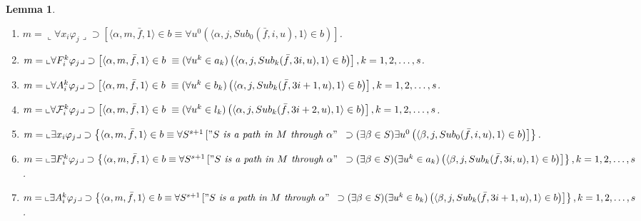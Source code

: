 \documentclass{asl}
\newtheorem{lemma}{Lemma}[section]
\theoremstyle{definition}
\begin{document}
\begin{lemma}
\begin{enumerate}
\item $m=\llcorner\forall x_i \varphi_j\lrcorner 
\supset \left[\langle\alpha, m,\bar{f},1\rangle \in b \equiv \forall u^0\left(\langle \alpha,j,
Sub_0(\bar{f},i,u),1\rangle \in b \right)\right]$.
\medskip

\item $m=\llcorner\forall F_i^k \varphi_j\lrcorner 
\supset \left[\langle\alpha, m,\bar{f},1\rangle \in b 
\right.
\smallskip
\\
\left.
\equiv(\forall u^k\in a_k)\left(\langle \alpha,j,
Sub_k(\bar{f},3i,u),1\rangle \in b \right)\right],
k=1,2,\ldots,s$.
\medskip

\item $m=\llcorner\forall A_i^k \varphi_j\lrcorner 
\supset \left[\langle\alpha, m,\bar{f},1\rangle \in b 
\right.
\smallskip
\\
\left.
\equiv(\forall u^k\in b_k)\left(\langle \alpha,j,
Sub_k(\bar{f},3i+1,u),1\rangle \in b \right)\right],
k=1,2,\ldots,s$.
\medskip

\item $m=\llcorner\forall \mathcal{F}_i^k \varphi_j\lrcorner 
\supset \left[\langle\alpha, m,\bar{f},1\rangle \in b 
\right.
\smallskip
\\
\left.
\equiv(\forall u^k\in l_k)\left(\langle \alpha,j,
Sub_k(\bar{f},3i+2,u),1\rangle \in b \right)\right],
k=1,2,\ldots,s$.
\medskip

\item $m=\llcorner\exists x_i \varphi_j\lrcorner 
\supset \left\lbrace \langle\alpha, m,\bar{f},1\rangle \in b \equiv 
\forall S^{s+1}\left["S\textit{ is a path in }M\textit{ through }\alpha" 
\right.
\right.
\smallskip
\\
\left.
\left.
\supset(\exists\beta\in S)\exists u^0\left(\langle \beta,j,Sub_0(\bar{f},i,u),1\rangle \in b \right)
\right] \right\rbrace$.
\medskip

\item $m=\llcorner\exists F_i^k \varphi_j\lrcorner 
\supset \left\lbrace \langle\alpha, m,\bar{f},1\rangle \in b \equiv 
\forall S^{s+1}\left["S\textit{ is a path in }M\textit{ through }\alpha" 
\right.
\right.
\smallskip
\\
\left.
\left.
\supset(\exists\beta\in S)(\exists u^k\in a_k)\left(\langle\beta,j,Sub_k(\bar{f},3i,u),1\rangle \in b \right)\right] \right\rbrace,k=1,2,\ldots,s$.
\medskip

\item $m=\llcorner\exists A_i^k \varphi_j\lrcorner 
\supset \left\lbrace \langle\alpha, m,\bar{f},1\rangle \in b \equiv 
\forall S^{s+1}\left["S\textit{ is a path in }M\textit{ through }\alpha" 
\right.
\right.
\smallskip
\\
\left.
\left.
\supset(\exists\beta\in S)(\exists u^k\in b_k)\left(\langle\beta,j,Sub_k(\bar{f},3i+1,u),1\rangle \in b \right)\right] \right\rbrace,k=1,2,\ldots,s$.
\medskip


\end{enumerate}
\end{lemma}
\end{document}
